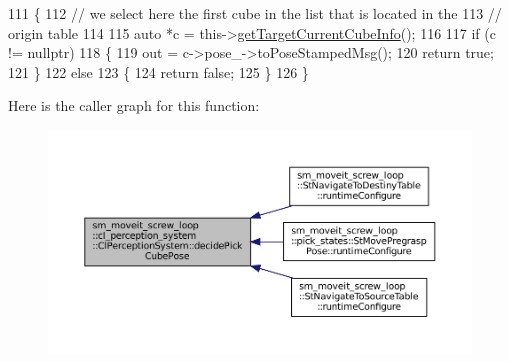 \begin{DoxyCode}
111             \{
112                 \textcolor{comment}{// we select here the first cube in the list that is located in the}
113                 \textcolor{comment}{// origin table}
114 
115                 \textcolor{keyword}{auto} *c = this->\hyperlink{classsm__moveit__screw__loop_1_1cl__perception__system_1_1ClPerceptionSystem_ad9231b87b9592cc5c847ce1b92a75446}{getTargetCurrentCubeInfo}();
116 
117                 \textcolor{keywordflow}{if} (c != \textcolor{keyword}{nullptr})
118                 \{
119                     out = c->pose\_->toPoseStampedMsg();
120                     \textcolor{keywordflow}{return} \textcolor{keyword}{true};
121                 \}
122                 \textcolor{keywordflow}{else}
123                 \{
124                     \textcolor{keywordflow}{return} \textcolor{keyword}{false};
125                 \}
126             \}
\end{DoxyCode}
Here is the caller graph for this function\+:
\nopagebreak
\begin{figure}[H]
\begin{center}
\leavevmode
\includegraphics[width=350pt]{classsm__moveit__screw__loop_1_1cl__perception__system_1_1ClPerceptionSystem_ad56389a13e7ce637a9095eff8837119f_icgraph}
\end{center}
\end{figure}
\mbox{\label{classsm__moveit__screw__loop_1_1cl__perception__system_1_1ClPerceptionSystem_a9157b898cd0b4004cf3d9144f7c1d163}} 
